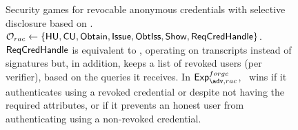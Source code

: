 \begin{figure}[ht!]
  \centering
  \caption{Security games for revocable anonymous credentials with selective
    disclosure based on \cite{fhs19}. 
    $\mathcal{O}_{rac} \gets \lbrace \mathsf{HU},\mathsf{CU},\mathsf{Obtain},
    \mathsf{Issue},\mathsf{ObtIss},\mathsf{Show},\mathsf{ReqCredHandle}\rbrace$.
    $\mathsf{ReqCredHandle}$ is
    equivalent to \OPEN, operating on transcripts \utrans instead of signatures
    but, in addition, keeps a list of revoked users (per verifier), based on the
    queries it receives. In $\Exp^{forge}_{\adv,rac}$, \adv~wins if it
    authenticates using a revoked credential or despite not having the required
    attributes, or if it prevents an honest user from authenticating using a
    non-revoked credential.}
  \label{fig:model-rac}  
\end{figure}

